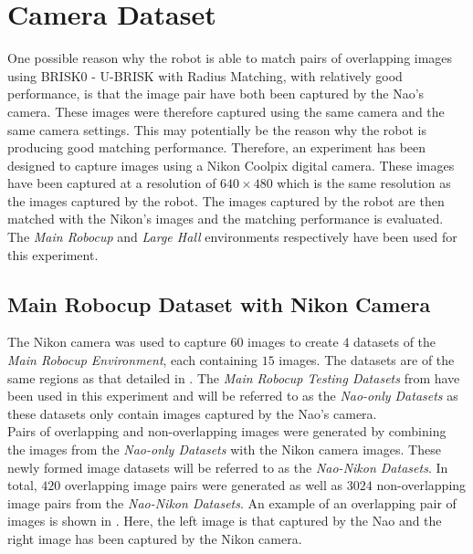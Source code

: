 \documentclass[11pt]{report}
\begin{document}
\section{Camera Dataset}
\label{sec:cameraMatching}
One possible reason why the robot is able to match pairs of overlapping images using BRISK0 - U-BRISK with Radius Matching, with relatively good performance, is that the image pair have both been captured by the Nao's camera. These images were therefore captured using the same camera and the same camera settings. This may potentially be the reason why the robot is producing good matching performance. Therefore, an experiment has been designed to capture images using a Nikon Coolpix digital camera. These images have been captured at a resolution of $640 \times 480$ which is the same resolution as the images captured by the robot. The images captured by the robot are then matched with the Nikon's images and the matching performance is evaluated. The \textit{Main Robocup} and \textit{Large Hall} environments respectively have been used for this experiment.\\

\subsection{Main Robocup Dataset with Nikon Camera}
\label{sec:nikonRobocup}

The Nikon camera was used to capture $60$ images to create $4$ datasets of the \textit{Main Robocup Environment}, each containing $15$ images. The datasets are of the same regions as that detailed in . The \textit{Main Robocup Testing Datasets} from  have been used in this experiment and will be referred to as the \textit{Nao-only Datasets} as these datasets only contain images captured by the Nao's camera.\\

Pairs of overlapping and non-overlapping images were generated by combining the images from the \textit{Nao-only Datasets} with the Nikon camera images. These newly formed image datasets will be referred to as the \textit{Nao-Nikon Datasets}. In total, $420$ overlapping image pairs were generated as well as $3024$ non-overlapping image pairs from the \textit{Nao-Nikon Datasets}. An example of an overlapping pair of images is shown in . Here, the left image is that captured by the Nao and the right image has been captured by the Nikon camera.\\
\end{document}
